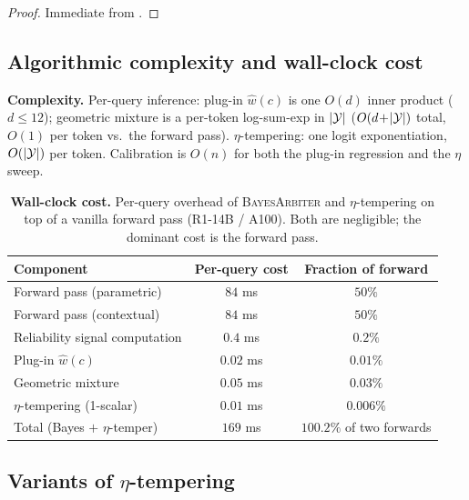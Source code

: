 \begin{proof}
Immediate from .
\end{proof}


\subsection{Algorithmic complexity and wall-clock cost}
\label{app:complexity}\label{app:wallclock}\label{app:complexity-and-cost}

\textbf{Complexity.}  Per-query inference: plug-in $\hat w(c)$ is one
$O(d)$ inner product ($d\!\le\!12$); geometric mixture is a per-token
log-sum-exp in $|\mathcal{Y}|$ ($O(d\!+\!|\mathcal{Y}|)$ total, $O(1)$ per token vs.\ the
forward pass).  $\eta$-tempering: one logit exponentiation, $O(|\mathcal{Y}|)$
per token.  Calibration is $O(n)$ for both the plug-in regression and
the $\eta$ sweep.

\begin{table}[H]
\centering\small
\caption{\textbf{Wall-clock cost.}  Per-query overhead of \textsc{BayesArbiter}
and $\eta$-tempering on top of a vanilla forward pass
(R1-14B / A100).  Both are negligible; the dominant cost is the
forward pass.}
\label{tab:wallclock}
\setlength{\tabcolsep}{4pt}
\begin{tabular}{lcc}
\toprule
\textbf{Component} & \textbf{Per-query cost} & \textbf{Fraction of forward}\\
\midrule
Forward pass (parametric)        & $84$ ms             & $50\%$\\
Forward pass (contextual)        & $84$ ms             & $50\%$\\
Reliability signal computation   & $0.4$ ms            & $0.2\%$\\
Plug-in $\hat w(c)$              & $0.02$ ms           & $0.01\%$\\
Geometric mixture                & $0.05$ ms           & $0.03\%$\\
$\eta$-tempering (1-scalar)      & $0.01$ ms           & $0.006\%$\\
\midrule
Total (Bayes $+$ $\eta$-temper) & $169$ ms        & $100.2\%$ of two forwards\\
\bottomrule
\end{tabular}
\end{table}


\subsection{Variants of $\eta$-tempering}
\label{app:eta-variants}

